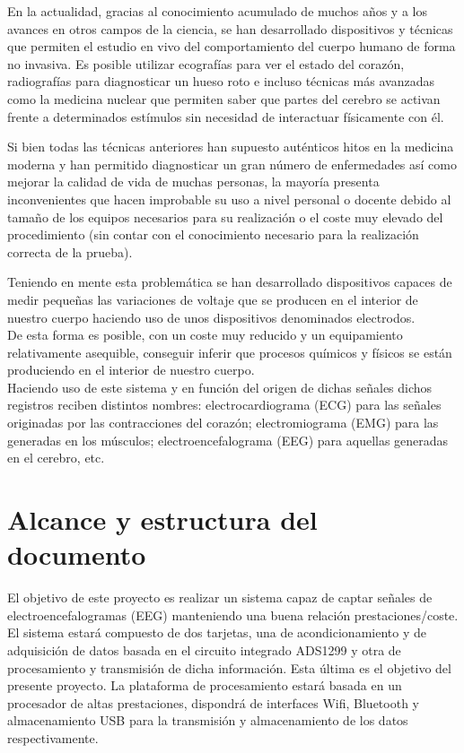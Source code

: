 En la actualidad, gracias al conocimiento acumulado de muchos años y a los avances en otros campos de la ciencia, se han desarrollado dispositivos y técnicas que permiten el estudio en vivo del comportamiento del cuerpo humano de forma no invasiva. Es posible utilizar ecografías para ver el estado del corazón, radiografías para diagnosticar un hueso roto e incluso técnicas más avanzadas como la medicina nuclear que permiten saber que partes del cerebro se activan frente a determinados estímulos sin necesidad de interactuar físicamente con él.

Si bien todas las técnicas anteriores han supuesto auténticos hitos en la medicina moderna y han permitido diagnosticar un gran número de enfermedades así como mejorar la calidad de vida de muchas personas, la mayoría presenta inconvenientes que hacen improbable su uso a nivel personal o docente debido al tamaño de los equipos necesarios para su realización o el coste muy elevado del procedimiento (sin contar con el conocimiento necesario para la realización correcta de la prueba).

Teniendo en mente esta problemática se han desarrollado dispositivos capaces de medir pequeñas las variaciones de voltaje que se producen en el interior de nuestro cuerpo haciendo uso de unos dispositivos denominados electrodos.
\\De esta forma es posible, con un coste muy reducido y un equipamiento relativamente asequible, conseguir inferir que procesos químicos y físicos se están produciendo en el interior de nuestro cuerpo.
\\Haciendo uso de este sistema y en función del origen de dichas señales dichos registros reciben distintos nombres: electrocardiograma (ECG) para las señales originadas por las contracciones del corazón; electromiograma (EMG) para las generadas en los músculos; electroencefalograma (EEG) para aquellas generadas en el cerebro, etc.


\section{Alcance y estructura del documento}
El objetivo de este proyecto es realizar un sistema capaz de captar señales de electroencefalogramas (EEG) manteniendo una buena relación prestaciones/coste. El sistema estará compuesto de dos tarjetas, una de acondicionamiento y de adquisición de datos basada en el circuito integrado ADS1299 y otra de procesamiento y transmisión de dicha información. Esta última es el objetivo del presente proyecto. La plataforma de procesamiento estará basada en un procesador de altas prestaciones, dispondrá de interfaces Wifi, Bluetooth y almacenamiento USB para la transmisión y almacenamiento de los datos respectivamente. 

